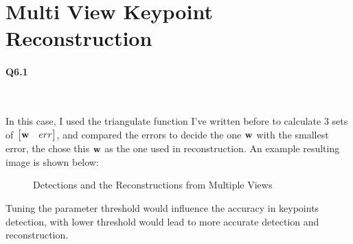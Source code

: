 \documentclass[11pt]{article} \usepackage{fullpage} \usepackage{graphicx} \usepackage{epstopdf} \usepackage{color} \usepackage{psfrag} \usepackage{pdfsync}\usepackage{indentfirst}\usepackage{subfigure}\usepackage{float}\usepackage[section]{placeins}
\begin{document}
\section{Multi View Keypoint Reconstruction}

\paragraph{Q6.1}~{}

In this case, I used the triangulate function I've written before to calculate $3$ sets of $\begin{bmatrix} \bold{w} & err \end{bmatrix}$, and compared the errors to decide the one $\bold{w}$ with the smallest error, the chose this $\bold{w}$ as the one used in reconstruction. An example resulting image is shown below:
\begin{figure}[H]
\centering
{}
\caption{Detections and the Reconstructions from Multiple Views}
\end{figure}

Tuning the parameter threshold would influence the accuracy in keypoints detection, with lower threshold would lead to more accurate detection and reconstruction.
\end{document}
